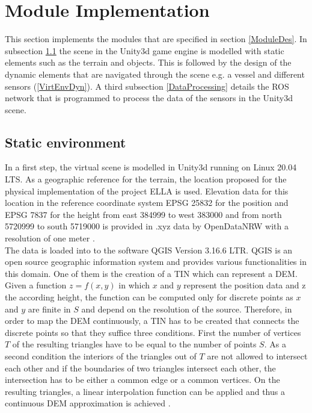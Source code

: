 \section{Module Implementation}\label{ModuleImp}
This section implements the modules that are specified in section \ref{ModuleDes}. In subsection \ref{VirtEnvStat} the scene in the Unity3d game engine is modelled with static elements such as the terrain and objects. This is followed by the design of the dynamic elements that are navigated through the scene e.g. a vessel and different sensors (\ref{VirtEnvDyn}). A third subsection \ref{DataProcessing} details the \ac{ROS} network that is programmed to process the data of the sensors in the Unity3d scene.

\subsection{Static environment} \label{VirtEnvStat}
In a first step, the virtual scene is modelled in Unity3d running on Linux 20.04 LTS. As a geographic reference for the terrain, the location proposed for the physical implementation of the project \ac{ELLA} is used. Elevation data for this location in the reference coordinate system EPSG 25832 for the position and EPSG 7837 for the height from east 384999 to west 383000 and from north 5720999 to south 5719000 is provided in .xyz data by OpenDataNRW with a resolution of one meter \cite{Xyzdata}.\\

The data is loaded into to the software QGIS Version 3.16.6 LTR. QGIS is an open source geographic information system and provides various functionalities in this domain. One of them is the creation of a \ac{TIN} which can represent a \ac{DEM}. Given a function $z = f(x,y)$ in which $x$ and $y$ represent the position data and z the according height, the function can be computed only for discrete points as $x$ and $y$ are finite in $S$ and depend on the resolution of the source. Therefore, in order to map the \ac{DEM} continuously, a \ac{TIN} has to be created that connects the discrete points so that they suffice three conditions. First the number of vertices $T$ of the resulting triangles have to be equal to the number of points $S$. As a second condition the interiors of the triangles out of $T$ are not allowed to intersect each other and if the boundaries of two triangles intersect each other, the intersection has to be either a common edge or a common vertices. On the resulting triangles, a linear interpolation function can be applied and thus a continuous \ac{DEM} approximation is achieved \cite{TIN}.\\

